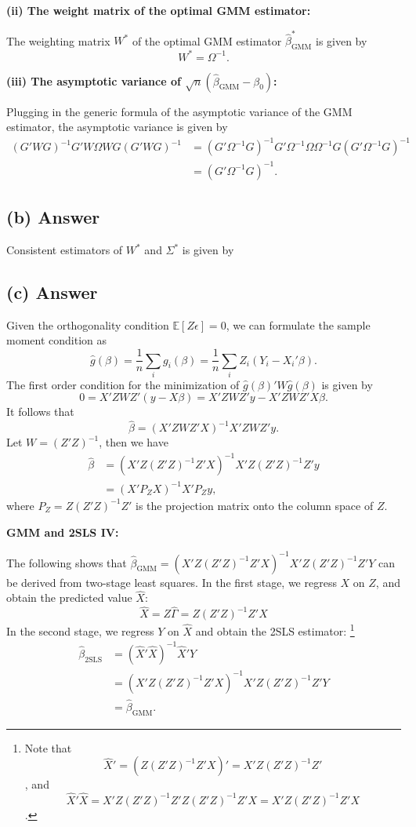 \documentclass[11pt]{article}
\theoremstyle{definition}
\theoremstyle{boldtitle} %
\numberwithin{equation}{section}
\numberwithin{figure}{section}
\numberwithin{table}{section}
\begin{document}
\vspace{5mm}
\noindent \textbf{(ii) The weight matrix of the optimal GMM estimator:}

The weighting matrix $W^*$ of the optimal GMM estimator $\hat{\beta}^*_{\text{GMM}}$ is given by 
\[
W^* = \Omega^{-1}.
\]

\vspace{5mm}
\noindent \textbf{(iii) The asymptotic variance of $\sqrt{n} \left( \hat{\beta}_{\text{GMM}} - \beta_0 \right)$:}

Plugging in the generic formula of the asymptotic variance of the GMM estimator,
the asymptotic variance is given by 
\begin{align*}
    (G'WG)^{-1}G'W\Omega W G(G'WG)^{-1} 
    & = (G'\Omega^{-1}G)^{-1}G'\Omega^{-1}\Omega \Omega^{-1} G(G'\Omega^{-1}G)^{-1} \\
    & = (G'\Omega^{-1}G)^{-1}.
\end{align*}


\subsection{(b) Answer}
Consistent estimators of $W^*$ and $\Sigma^*$ is given by 


\subsection{(c) Answer}
Given the orthogonality condition $\mathbb{E}[Z\epsilon] = 0$, we can formulate the sample moment condition as
\[
\hat{g}(\beta) = \frac{1}{n} \sum_i g_i(\beta) = \frac{1}{n} \sum_i Z_i (Y_i - X_i'\beta).
\]
The first order condition for the minimization of $\hat{g}(\beta)' W \hat{g}(\beta)$ is given by
\[
0 = X'Z W Z'(y - X\beta) = X'Z W Z' y - X'Z W Z' X \beta.
\]
It follows that 
\[
\hat{\beta} = \left( X'Z W Z' X \right)^{-1} X'Z W Z' y.
\]
Let $W = (Z'Z)^{-1}$, then we have
\begin{align*}
\hat{\beta} & = \left( X'Z (Z'Z)^{-1} Z' X \right)^{-1} X'Z (Z'Z)^{-1} Z' y \\ 
    & = \left( X' P_Z X \right)^{-1} X' P_Z y,
\end{align*}
where $P_Z = Z(Z'Z)^{-1}Z'$ is the projection matrix onto the column space of $Z$.

\vspace{10mm}
\noindent \textbf{GMM and 2SLS IV:}

The following shows that $\hat{\beta}_{\text{GMM}} = \left( X'Z (Z'Z)^{-1} Z' X \right)^{-1} X'Z (Z'Z)^{-1} Z' Y$ can be derived from two-stage least squares.
In the first stage, we regress $X$ on $Z$, and obtain the predicted value $\hat{X}$:
\[
\hat{X} = Z \hat{\Gamma} = Z(Z'Z)^{-1}Z'X
\]
In the second stage, we regress $Y$ on $\hat{X}$ and obtain the 2SLS estimator:%
\footnote{
Note that 
\[
\hat{X}' = (Z(Z'Z)^{-1}Z'X)' = X'Z(Z'Z)^{-1}Z'
\], and
\[
\hat{X}' \hat{X} = X'Z(Z'Z)^{-1}Z'Z(Z'Z)^{-1}Z'X = X'Z(Z'Z)^{-1}Z'X
\].
}
\begin{align*}
\hat{\beta}_{\text{2SLS}} & = (\hat{X}'\hat{X})^{-1}\hat{X}'Y \\ 
& = (X'Z(Z'Z)^{-1}Z'X)^{-1} X'Z(Z'Z)^{-1}Z' Y \\ 
& = \hat{\beta}_{\text{GMM}}.
\end{align*}


\end{document}
